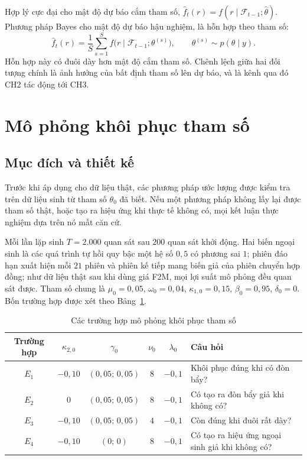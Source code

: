 \documentclass[12pt,a4paper]{article}
\theoremstyle{definition}
\theoremstyle{remark}
\newcommand{\Fcal}{\mathcal{F}}
\begin{document}
Hợp lý cực đại cho mật độ dự báo cắm tham số, $\hat f_t(r)=f(r\mid\Fcal_{t-1};\hat\theta)$. Phương pháp Bayes cho mật độ dự báo hậu nghiệm, là hỗn hợp theo tham số:
\begin{equation}\label{eq:mdhn}
\hat f_t(r)=\frac1S\sum_{s=1}^{S}f\big(r\mid\Fcal_{t-1};\theta^{(s)}\big),\qquad \theta^{(s)}\sim p(\theta\mid y).
\end{equation}
Hỗn hợp này có đuôi dày hơn mật độ cắm tham số. Chênh lệch giữa hai đối tượng chính là ảnh hưởng của bất định tham số lên dự báo, và là kênh qua đó CH2 tác động tới CH3.

\section{Mô phỏng khôi phục tham số}\label{sec:mophong}

\subsection{Mục đích và thiết kế}

Trước khi áp dụng cho dữ liệu thật, các phương pháp ước lượng được kiểm tra trên dữ liệu sinh từ tham số $\theta_0$ đã biết. Nếu một phương pháp không lấy lại được tham số thật, hoặc tạo ra hiệu ứng khi thực tế không có, mọi kết luận thực nghiệm dựa trên nó mất căn cứ.

Mỗi lần lặp sinh $T=2.000$ quan sát sau $200$ quan sát khởi động. Hai biến ngoại sinh là các quá trình tự hồi quy bậc một hệ số $0{,}5$ có phương sai $1$; phiên đáo hạn xuất hiện mỗi $21$ phiên và phiên kế tiếp mang biến giả của phiên chuyển hợp đồng; như dữ liệu thật sau khi dùng giá F2M, mọi lợi suất mô phỏng đều quan sát được. Tham số chung là $\mu_0=0{,}05$, $\omega_0=0{,}04$, $\kappa_{1,0}=0{,}15$, $\beta_0=0{,}95$, $\delta_0=0$. Bốn trường hợp được xét theo Bảng~\ref{tab:truonghop}.

\begin{table}[h]
\centering
\caption{Các trường hợp mô phỏng khôi phục tham số}\label{tab:truonghop}
\begin{tabular}{@{}cccccp{5.6cm}@{}}
\toprule
\textbf{Trường hợp} & $\kappa_{2,0}$ & $\gamma_0$ & $\nu_0$ & $\lambda_0$ & \textbf{Câu hỏi} \\
\midrule
$E_1$ & $-0{,}10$ & $(0{,}05;\,0{,}05)$ & $8$ & $-0{,}1$ & Khôi phục đúng khi có đòn bẩy? \\
$E_2$ & $0$ & $(0{,}05;\,0{,}05)$ & $8$ & $-0{,}1$ & Có tạo ra đòn bẩy giả khi không có? \\
$E_3$ & $-0{,}10$ & $(0{,}05;\,0{,}05)$ & $4$ & $-0{,}1$ & Còn đúng khi đuôi rất dày? \\
$E_4$ & $-0{,}10$ & $(0;\,0)$ & $8$ & $-0{,}1$ & Có tạo ra hiệu ứng ngoại sinh giả khi không có? \\
\bottomrule
\end{tabular}
\end{table}
\end{document}
